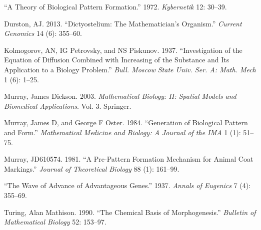 \documentclass[
  letterpaper,
  DIV=11,
  numbers=noendperiod]{scrreprt}
\newlength{\cslhangindent}
\newlength{\cslentryspacingunit} %
\newenvironment{CSLReferences}[2] %
 {%
  \setlength{\parindent}{0pt}
  \ifodd #1
  \let\oldpar\par
  \def\par{\hangindent=\cslhangindent\oldpar}
  \fi
  \setlength{\parskip}{#2\cslentryspacingunit}
 }%
 {}
\theoremstyle{definition}
\theoremstyle{plain}
\theoremstyle{plain}
\theoremstyle{remark}
\begin{document}
\hypertarget{refs}{}
\begin{CSLReferences}{1}{0}
\leavevmode{}%
{``A Theory of Biological Pattern Formation.''} 1972. \emph{Kybernetik}
12: 30--39.

\leavevmode{}%
Durston, AJ. 2013. {``Dictyostelium: The Mathematician's Organism.''}
\emph{Current Genomics} 14 (6): 355--60.

\leavevmode{}%
Kolmogorov, AN, IG Petrovsky, and NS Piskunov. 1937. {``Investigation of
the Equation of Diffusion Combined with Increasing of the Substance and
Its Application to a Biology Problem.''} \emph{Bull. Moscow State Univ.
Ser. A: Math. Mech} 1 (6): 1--25.

\leavevmode{}%
Murray, James Dickson. 2003. \emph{Mathematical Biology: II: Spatial
Models and Biomedical Applications}. Vol. 3. Springer.

\leavevmode{}%
Murray, James D, and George F Oster. 1984. {``Generation of Biological
Pattern and Form.''} \emph{Mathematical Medicine and Biology: A Journal
of the IMA} 1 (1): 51--75.

\leavevmode{}%
Murray, JD610574. 1981. {``A Pre-Pattern Formation Mechanism for Animal
Coat Markings.''} \emph{Journal of Theoretical Biology} 88 (1): 161--99.

\leavevmode{}%
{``The Wave of Advance of Advantageous Genes.''} 1937. \emph{Annals of
Eugenics} 7 (4): 355--69.

\leavevmode{}%
Turing, Alan Mathison. 1990. {``The Chemical Basis of Morphogenesis.''}
\emph{Bulletin of Mathematical Biology} 52: 153--97.

\end{CSLReferences}
\end{document}
